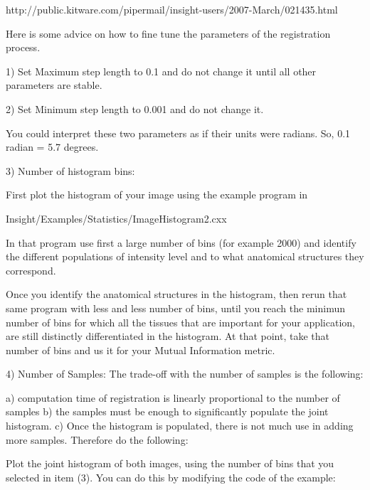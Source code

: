 http://public.kitware.com/pipermail/insight-users/2007-March/021435.html

Here is some advice on how to fine tune the parameters
of the registration process.


1) Set Maximum step length to 0.1 and do not change it
   until all other parameters are stable.

2) Set Minimum step length to 0.001 and do not change it.

   You could interpret these two parameters as if their
   units were radians. So, 0.1 radian = 5.7 degrees.


3) Number of histogram bins:

    First plot the histogram of your image using the
    example program in

    Insight/Examples/Statistics/ImageHistogram2.cxx

    In that program use first a large number  of bins
    (for example 2000) and identify the different
    populations of intensity level and to what anatomical
    structures they correspond.

    Once you identify the anatomical structures in the
    histogram, then rerun that same program with less
    and less number of bins, until you reach the minimun
    number of bins for which all the tissues that are important
    for your application, are still distinctly differentiated in the
    histogram.  At that point, take that number of bins and
    us it for your Mutual Information metric.


4)  Number of Samples:
    The trade-off with the number of samples is the following:

    a) computation time of registration is linearly proportional
       to the number of samples
                                                                                                                        b) the samples must be enough to significantly populate
                                                                                                                           the joint histogram.
                                                                                                                        c) Once the histogram is populated, there is not much
                                                                                                                           use in adding more samples.
Therefore do the following:

Plot the joint histogram of both images, using the number
of bins that you selected in item (3). You can do this by
modifying the code of the example:

